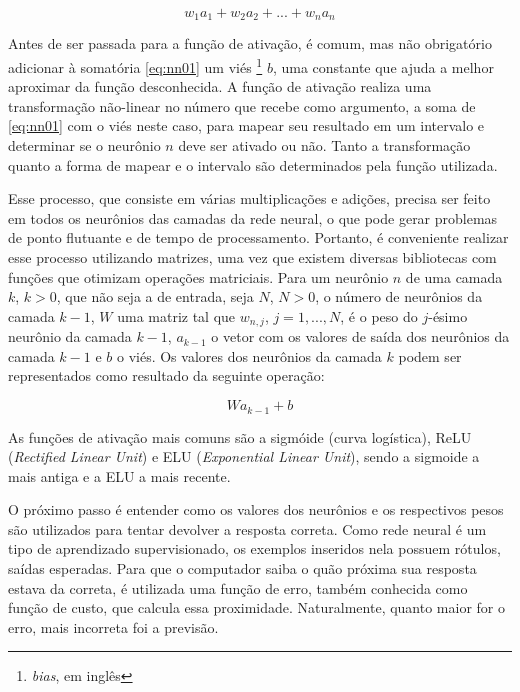 \begin{equation} \label{eq:nn01}
w_{1}a_{1} + w_{2}a_{2} + ... + w_{n}a_{n}
\end{equation}

Antes de ser passada para a função de ativação, é comum, mas não obrigatório adicionar à somatória \ref{eq:nn01} um viés \footnote{\textit{bias}, em inglês} $b$, uma constante que ajuda a melhor aproximar da função desconhecida.
A função de ativação realiza uma transformação não-linear no número que recebe como argumento, a soma de \ref{eq:nn01} com o viés neste caso, para mapear seu resultado em um intervalo e determinar se o neurônio $n$ deve ser ativado ou não.
Tanto a transformação quanto a forma de mapear e o intervalo são determinados pela função utilizada.

Esse processo, que consiste em várias multiplicações e adições, precisa ser feito em todos os neurônios das camadas da rede neural, o que pode gerar problemas de ponto flutuante e de tempo de processamento.
Portanto, é conveniente realizar esse processo utilizando matrizes, uma vez que existem diversas bibliotecas com funções que otimizam operações matriciais.
Para um neurônio $n$ de uma camada $k$, $k > 0$, que não seja a de entrada, seja $N$, $N > 0$, o número de neurônios da camada $k-1$, $W$ uma matriz tal que $w_{n, j}$, $j = 1, ..., N$, é o peso do $j$-ésimo neurônio da camada $k-1$, $a_{k-1}$ o vetor com os valores de saída dos neurônios da camada $k-1$ e $b$ o viés.
Os valores dos neurônios da camada $k$ podem ser representados como resultado da seguinte operação:

\begin{equation} \label{eq:nn02}
Wa_{k-1} + b
\end{equation}

As funções de ativação mais comuns são a sigmóide (curva logística), ReLU (\textit{Rectified Linear Unit}) e ELU (\textit{Exponential Linear Unit}), sendo a sigmoide a mais antiga e a ELU a mais recente.

O próximo passo é entender como os valores dos neurônios e os respectivos pesos são utilizados para tentar devolver a resposta correta.
Como rede neural é um tipo de aprendizado supervisionado, os exemplos inseridos nela possuem rótulos, saídas esperadas.
Para que o computador saiba o quão próxima sua resposta estava da correta, é utilizada uma função de erro, também conhecida como função de custo, que calcula essa proximidade.
Naturalmente, quanto maior for o erro, mais incorreta foi a previsão.%

